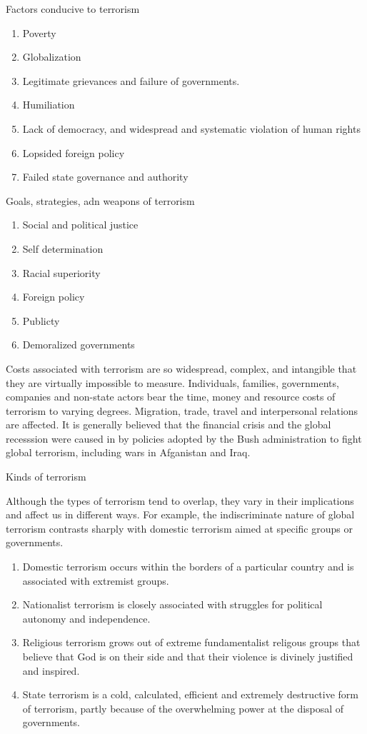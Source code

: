 \documentclass[
  openany]{book}
\providecommand{\tightlist}{%
  \setlength{\itemsep}{0pt}\setlength{\parskip}{0pt}}
\begin{document}
Factors conducive to terrorism

\begin{enumerate}
\def\labelenumi{\arabic{enumi}.}
\tightlist
\item
  Poverty
\item
  Globalization
\item
  Legitimate grievances and failure of governments.
\item
  Humiliation
\item
  Lack of democracy, and widespread and systematic violation of human rights
\item
  Lopsided foreign policy
\item
  Failed state governance and authority
\end{enumerate}

Goals, strategies, adn weapons of terrorism

\begin{enumerate}
\def\labelenumi{\arabic{enumi}.}
\tightlist
\item
  Social and political justice
\item
  Self determination
\item
  Racial superiority
\item
  Foreign policy
\item
  Publicty
\item
  Demoralized governments
\end{enumerate}

Costs associated with terrorism are so widespread, complex, and intangible that they are virtually impossible to measure. Individuals, families, governments, companies and non-state actors bear the time, money and resource costs of terrorism to varying degrees. Migration, trade, travel and interpersonal relations are affected. It is generally believed that the financial crisis and the global recesssion were caused in by policies adopted by the Bush administration to fight global terrorism, including wars in Afganistan and Iraq.

Kinds of terrorism

Although the types of terrorism tend to overlap, they vary in their implications and affect us in different ways. For example, the indiscriminate nature of global terrorism contrasts sharply with domestic terrorism aimed at specific groups or governments.

\begin{enumerate}
\def\labelenumi{\arabic{enumi}.}
\tightlist
\item
  Domestic terrorism occurs within the borders of a particular country and is associated with extremist groups.
\item
  Nationalist terrorism is closely associated with struggles for political autonomy and independence.
\item
  Religious terrorism grows out of extreme fundamentalist religous groups that believe that God is on their side and that their violence is divinely justified and inspired.
\item
  State terrorism is a cold, calculated, efficient and extremely destructive form of terrorism, partly because of the overwhelming power at the disposal of governments.
\end{enumerate}
\end{document}
